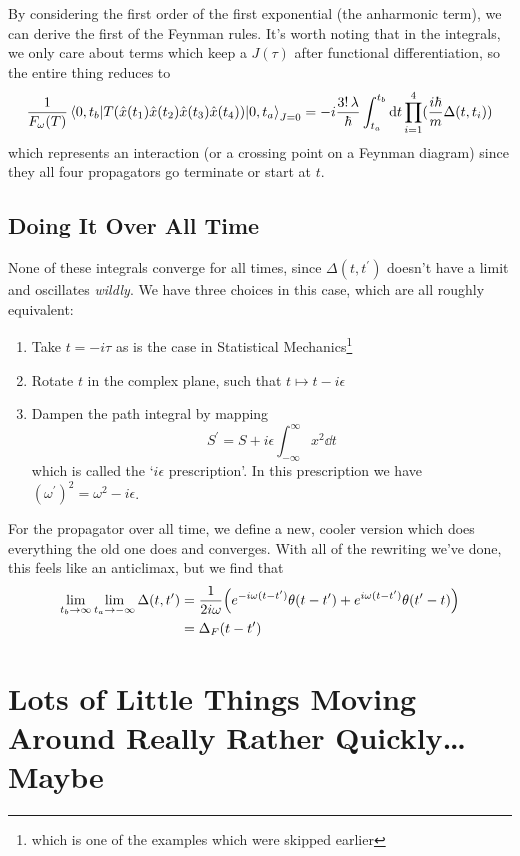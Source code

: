 \documentclass[]{revision-notes}
\begin{document}
By considering the first order of the first exponential (the anharmonic term), we can derive the first of the Feynman rules.
It's worth noting that in the integrals, we only care about terms which keep a \( J(\tau) \) after functional differentiation, so the entire thing reduces to \[\frac{1}{F_\omega(T)} \mel{0, t_b}{T(\hat{x}(t_1) \hat{x}(t_2) \hat{x}(t_3) \hat{x}(t_4)) }{0, t_a}_{J=0} = -i \frac{3!\, \lambda}{\hbar}\int_{t_a}^{t_b} \dd{t} \prod_{i=1}^{4}(\frac{i\hbar}{m}\Delta(t, t_i))\]
which represents an interaction (or a crossing point on a Feynman diagram) since they all four propagators go terminate or start at \(t\).

\section{Doing It Over All Time}
None of these integrals converge for all times, since \(\Delta(t, t^\prime)\) doesn't have a limit and oscillates \emph{wildly}.
We have three choices in this case, which are all roughly equivalent:
\begin{enumerate}
  \item Take \( t = -i\tau \) as is the case in Statistical Mechanics\footnote{which is one of the examples which were skipped earlier}
  \item Rotate \(t\) in the complex plane, such that \( t \mapsto t - i\epsilon \)
  \item Dampen the path integral by mapping \[ S^\prime = S + i\epsilon \int_{-\infty}^\infty x^2 \dd{t} \] which is called the `\(i\epsilon\) prescription'. In this prescription we have \( (\omega^\prime)^2 = \omega^2 - i \epsilon \).
\end{enumerate}

For the propagator over all time, we define a new, cooler version which does everything the old one does and converges.
With all of the rewriting we've done, this feels like an anticlimax, but we find that
\begin{align*}
  \lim_{t_b\to \infty}\lim_{t_a\to -\infty}\Delta(t, t^\prime) &= \frac{1}{2i\omega}\qty(e^{-i\omega(t-t^\prime)} \theta(t-t^\prime) + e^{i\omega(t-t^\prime)} \theta(t^\prime - t))\\
  &= \Delta_F(t- t^\prime)
\end{align*}

\chapter{Lots of Little Things Moving Around Really Rather Quickly\ldots{} Maybe}
\end{document}
